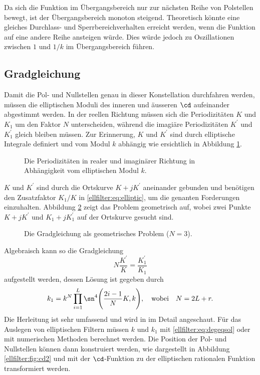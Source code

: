 Da sich die Funktion im Übergangsbereich nur zur nächsten Reihe von Polstellen bewegt, ist der Übergangsbereich monoton steigend.
Theoretisch könnte eine gleiches Durchlass- und Sperrbereichverhalten erreicht werden, wenn die Funktion auf eine andere Reihe ansteigen würde.
Dies würde jedoch zu Oszillationen zwischen $1$ und $1/k$ im Übergangsbereich führen.

\subsection{Gradgleichung}

Damit die Pol- und Nullstellen genau in dieser Konstellation durchfahren werden, müssen die elliptischen Moduli des inneren und äusseren $\cd$ aufeinander abgestimmt werden.
In der reellen Richtung müssen sich die Periodizitäten $K$ und $K_1$ um den Faktor $N$ unterscheiden, während die imagiäre Periodizitäten $K^\prime$ und $K^\prime_1$ gleich bleiben müssen.
Zur Erinnerung, $K$ und $K^\prime$ sind durch elliptische Integrale definiert und vom Modul $k$ abhängig wie ersichtlich in Abbildung \ref{ellfilter:fig:kprime}.
\begin{figure}
    \centering
    
    \caption{Die Periodizitäten in realer und imaginärer Richtung in Abhängigkeit vom elliptischen Modul $k$.}
    \label{ellfilter:fig:kprime}
\end{figure}
$K$ und $K^\prime$ sind durch die Ortskurve $K + jK^\prime$ aneinander gebunden und benötigen den Zusatzfaktor $K_1/K$ in \eqref{ellfilter:eq:elliptic}, um die genanten Forderungen einzuhalten.
Abbildung \ref{ellfilter:fig:degree_eq} zeigt das Problem geometrisch auf, wobei zwei Punkte $K+jK^\prime$ und $K_1+jK_1^\prime$ auf der Ortskurve gesucht sind.
\begin{figure}
    \centering
    
    \caption{Die Gradgleichung als geometrisches Problem ($N=3$).}
    \label{ellfilter:fig:degree_eq}
\end{figure}
Algebraisch kann so die Gradgleichung
\begin{equation}
    N \frac{K^\prime}{K} = \frac{K^\prime_1}{K_1}
\end{equation}
aufgestellt werden, dessen Lösung ist gegeben durch
\begin{equation}\label{ellfilter:eq:degeqsol}
k_1 = k^N \prod_{i=1}^L \sn^4 \Bigg( \frac{2i - 1}{N} K, k \Bigg),
\quad \text{wobei} \quad
N = 2L+r.
\end{equation}
Die Herleitung ist sehr umfassend und wird in \cite{ellfilter:bib:orfanidis} im Detail angeschaut.
Für das Auslegen von elliptischen Filtern müssen $k$ und $k_1$ mit \eqref{ellfilter:eq:degeqsol} oder mit numerischen Methoden berechnet werden.
Die Position der Pol- und Nullstellen können dann konstruiert werden, wie dargestellt in Abbildung \ref{ellfilter:fig:cd2} und mit der $\cd$-Funktion zu der elliptischen rationalen Funktion transformiert werden.

